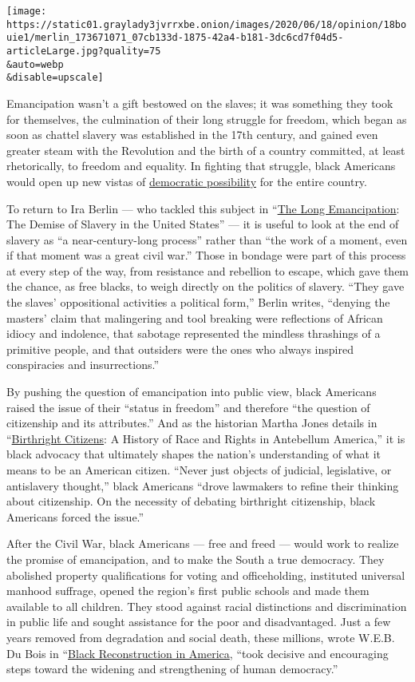 \texttt{[image: https://static01.graylady3jvrrxbe.onion/images/2020/06/18/opinion/18bouie1/merlin\_173671071\_07cb133d-1875-42a4-b181-3dc6cd7f04d5-articleLarge.jpg?quality=75\\\&auto=webp\\\&disable=upscale]}

Emancipation wasn't a gift bestowed on the slaves; it was something they
took for themselves, the culmination of their long struggle for freedom,
which began as soon as chattel slavery was established in the 17th
century, and gained even greater steam with the Revolution and the birth
of a country committed, at least rhetorically, to freedom and equality.
In fighting that struggle, black Americans would open up new vistas of
\href{https://www.nytimes3xbfgragh.onion/interactive/2019/08/14/magazine/black-history-american-democracy.html}{democratic
possibility} for the entire country.

To return to Ira Berlin --- who tackled this subject in
``\href{https://www.hup.harvard.edu/catalog.php?isbn=9780674286085}{The
Long Emancipation}: The Demise of Slavery in the United States'' --- it
is useful to look at the end of slavery as ``a near-century-long
process'' rather than ``the work of a moment, even if that moment was a
great civil war.'' Those in bondage were part of this process at every
step of the way, from resistance and rebellion to escape, which gave
them the chance, as free blacks, to weigh directly on the politics of
slavery. ``They gave the slaves' oppositional activities a political
form,'' Berlin writes, ``denying the masters' claim that malingering and
tool breaking were reflections of African idiocy and indolence, that
sabotage represented the mindless thrashings of a primitive people, and
that outsiders were the ones who always inspired conspiracies and
insurrections.''

By pushing the question of emancipation into public view, black
Americans raised the issue of their ``status in freedom'' and therefore
``the question of citizenship and its attributes.'' And as the historian
Martha Jones details in
``\href{https://marthasjones.com/birthright-citizens/}{Birthright
Citizens}: A History of Race and Rights in Antebellum America,'' it is
black advocacy that ultimately shapes the nation's understanding of what
it means to be an American citizen. ``Never just objects of judicial,
legislative, or antislavery thought,'' black Americans ``drove lawmakers
to refine their thinking about citizenship. On the necessity of debating
birthright citizenship, black Americans forced the issue.''

After the Civil War, black Americans --- free and freed --- would work
to realize the promise of emancipation, and to make the South a true
democracy. They abolished property qualifications for voting and
officeholding, instituted universal manhood suffrage, opened the
region's first public schools and made them available to all children.
They stood against racial distinctions and discrimination in public life
and sought assistance for the poor and disadvantaged. Just a few years
removed from degradation and social death, these millions, wrote W.E.B.
Du Bois in ``\href{http://www.webdubois.org/wdb-BlackReconst.html}{Black
Reconstruction in America}, ``took decisive and encouraging steps toward
the widening and strengthening of human democracy.''

